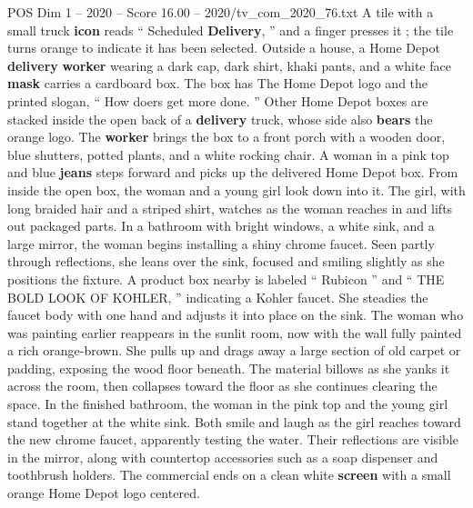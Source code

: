 \begin{textsample}{POS Dim 1 – 2020 – Score 16.00 – 2020/tv\_com\_2020\_76.txt}
A tile with a small truck \textbf{icon} reads “ Scheduled \textbf{Delivery}, ” and a finger presses it ; the tile turns orange to indicate it has been selected.
Outside a house, a Home Depot \textbf{delivery} \textbf{worker} wearing a dark cap, dark shirt, khaki pants, and a white face \textbf{mask} carries a cardboard box.
The box has The Home Depot logo and the printed slogan, “ How doers get more done. ” Other Home Depot boxes are stacked inside the open back of a \textbf{delivery} truck, whose side also \textbf{bears} the orange logo.
The \textbf{worker} brings the box to a front porch with a wooden door, blue shutters, potted plants, and a white rocking chair.
A woman in a pink top and blue \textbf{jeans} steps forward and picks up the delivered Home Depot box.
From inside the open box, the woman and a young girl look down into it.
The girl, with long braided hair and a striped shirt, watches as the woman reaches in and lifts out packaged parts.
In a bathroom with bright windows, a white sink, and a large mirror, the woman begins installing a shiny chrome faucet.
Seen partly through reflections, she leans over the sink, focused and smiling slightly as she positions the fixture.
A product box nearby is labeled “ Rubicon ” and “ THE BOLD LOOK OF KOHLER, ” indicating a Kohler faucet.
She steadies the faucet body with one hand and adjusts it into place on the sink.
The woman who was painting earlier reappears in the sunlit room, now with the wall fully painted a rich orange-brown.
She pulls up and drags away a large section of old carpet or padding, exposing the wood floor beneath.
The material billows as she yanks it across the room, then collapses toward the floor as she continues clearing the space.
In the finished bathroom, the woman in the pink top and the young girl stand together at the white sink.
Both smile and laugh as the girl reaches toward the new chrome faucet, apparently testing the water.
Their reflections are visible in the mirror, along with countertop accessories such as a soap dispenser and toothbrush holders.
The commercial ends on a clean white \textbf{screen} with a small orange Home Depot logo centered.

\end{textsample}
